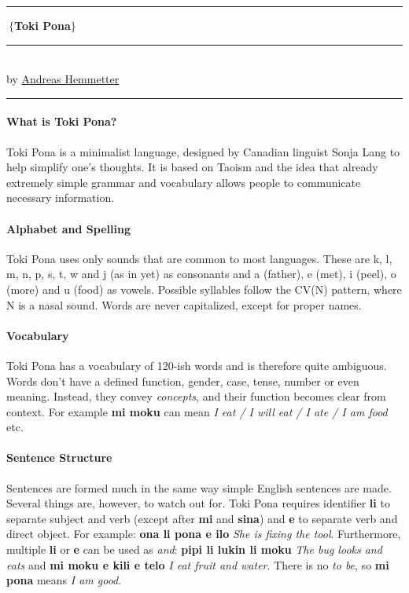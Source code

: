 \documentclass[10pt,a4paper]{article}
\author{Andreas Hemmetter}
\begin{document}
\pagestyle{empty}
\begin{center}
\rule{40mm}{2pt}$~\big\{$\textbf{{\large  Toki Pona}}$\big\}~$\rule{40mm}{2pt}\\
by \href{mailto:a.hemmetter@gmail.com}{Andreas Hemmetter}
\rule{15cm}{0.2pt}
\end{center}

\paragraph{What is Toki Pona?}
Toki Pona is a minimalist language, designed by Canadian linguist Sonja Lang to help simplify one's thoughts. It is based on Taoism and the idea that already extremely simple grammar and vocabulary allows people to communicate necessary information.

\paragraph{Alphabet and Spelling}

Toki Pona uses only sounds that are common to most languages. These are k, l, m, n, p, s, t, w and j (as in yet) as consonants and a (father), e (met), i (peel), o (more) and u (food) as vowels. Possible syllables follow the CV(N) pattern, where N is a nasal sound. Words are never capitalized, except for proper names.

\paragraph{Vocabulary}

Toki Pona has a vocabulary of 120-ish words and is therefore quite ambiguous. Words don't have a defined function, gender, case, tense, number or even meaning. Instead, they convey \textit{concepts}, and their function becomes clear from context. For example \textbf{mi moku} can mean \textit{I eat / I will eat / I ate / I am food} etc.

\paragraph{Sentence Structure}

Sentences are formed much in the same way simple English sentences are made. Several things are, however, to watch out for. Toki Pona requires identifier \textbf{li} to separate subject and verb (except after \textbf{mi} and \textbf{sina}) and \textbf{e} to separate verb and direct object. For example: \textbf{ona li pona e ilo} \textit{She is fixing the tool}. Furthermore, multiple \textbf{li} or \textbf{e} can be used as \textit{and}: \textbf{pipi li lukin li moku} \textit{The bug looks and eats} and \textbf{mi moku e kili e telo} \textit{I eat fruit and water}. There is no \textit{to be}, so \textbf{mi pona} means \textit{I am good}.
\end{document}
